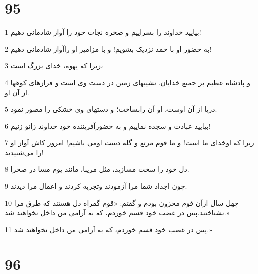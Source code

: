 \chapter{95}

\par 1 بیایید خداوند را بسراییم و صخره نجات خود را آواز شادمانی دهیم!
\par 2 به حضور او با حمد نزدیک بشویم! و با مزامیر او راآواز شادمانی دهیم!
\par 3 زیرا که یهوه، خدای بزرگ است،
\par 4 و پادشاه عظیم بر جمیع خدایان. نشیبهای زمین در دست وی است و فرازهای کوهها از آن او.
\par 5 دریا از آن اوست، او آن رابساخت؛ و دستهای وی خشکی را مصور نمود.
\par 6 بیایید عبادت و سجده نماییم و به حضورآفریننده خود خداوند زانو زنیم!
\par 7 زیرا که اوخدای ما است! و ما قوم مرتع و گله دست اومی باشیم! امروز کاش آواز او را می‌شنیدید!
\par 8 دل خود را سخت مسازید، مثل مریبا، مانند یوم مسا در صحرا.
\par 9 چون اجداد شما مرا آزمودند وتجربه کردند و اعمال مرا دیدند.
\par 10 چهل سال ازآن قوم محزون بودم و گفتم: «قوم گمراه دل هستند که طرق مرا نشناختند.پس در غضب خود قسم خوردم، که به آرامی من داخل نخواهند شد.»
\par 11 پس در غضب خود قسم خوردم، که به آرامی من داخل نخواهند شد.»
 
\chapter{96}


